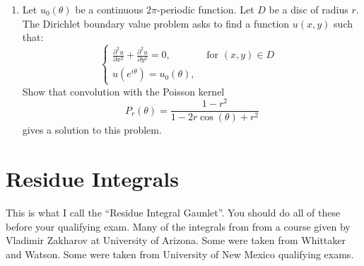 \documentclass[a4paper,10pt]{article}
\begin{document}
\begin{enumerate}
		
			
		\item Let $u_0(\theta)$ be a continuous $2\pi$-periodic function. 
			Let $D$ be a disc of radius $r$. 
			The Dirichlet boundary value problem asks to find a function $u(x,y)$ such that:
			$$ \begin{cases}
			\frac{\partial^2 u}{\partial x^2} + \frac{\partial^2 u}{\partial y^2} =0, & \mbox{ for $(x,y)\in D$ } \\
			u(e^{i\theta})= u_0(\theta), & 
			\end{cases}
			$$
			Show that convolution with the Poisson kernel 
			$$P_r(\theta) = \frac{1-r^2}{1-2r\cos(\theta) + r^2}$$
			gives a solution to this problem. 
			
	
	

	
\end{enumerate}

\section{Residue Integrals}
This is what I call the ``Residue Integral Gaunlet''. You should do all of these before your qualifying exam. 
Many of the integrals from from a course given by Vladimir Zakharov at University of Arizona. 
Some were taken from Whittaker and Watson. Some were taken from University of New Mexico qualifying exams.
\end{document}
